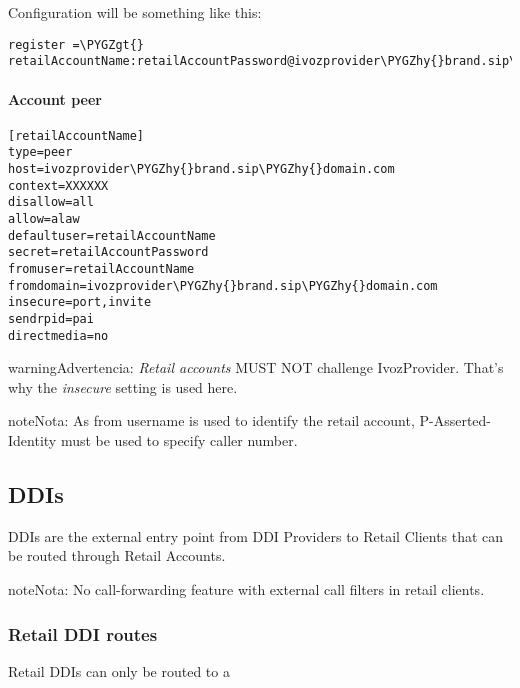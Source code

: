 \documentclass[letterpaper,10pt,spanish]{sphinxmanual}
\def\PYGZgt{\char`\>}
\def\PYGZhy{\char`\-}
\begin{document}
Configuration will be something like this:

\begin{Verbatim}[commandchars=\\\{\}]
register =\PYGZgt{} retailAccountName:retailAccountPassword@ivozprovider\PYGZhy{}brand.sip\PYGZhy{}domain.com
\end{Verbatim}


\paragraph{Account peer}
\label{administration_portal/client/retail/retail_accounts:account-peer}
\begin{Verbatim}[commandchars=\\\{\}]
[retailAccountName]
type=peer
host=ivozprovider\PYGZhy{}brand.sip\PYGZhy{}domain.com
context=XXXXXX
disallow=all
allow=alaw
defaultuser=retailAccountName
secret=retailAccountPassword
fromuser=retailAccountName
fromdomain=ivozprovider\PYGZhy{}brand.sip\PYGZhy{}domain.com
insecure=port,invite
sendrpid=pai
directmedia=no
\end{Verbatim}

\begin{notice}{warning}{Advertencia:}
\emph{Retail accounts} MUST NOT challenge IvozProvider. That's
why the \emph{insecure} setting is used here.
\end{notice}

\begin{notice}{note}{Nota:}
As from username is used to identify the retail account, P-Asserted-Identity must be used to specify caller number.
\end{notice}


\subsection{DDIs}
\label{administration_portal/client/retail/ddis:ddis}\label{administration_portal/client/retail/ddis::doc}\label{administration_portal/client/retail/ddis:retail-ddis}
DDIs are the external entry point from DDI Providers to Retail Clients that
can be routed through Retail Accounts.

\begin{notice}{note}{Nota:}
No call-forwarding feature with external call filters in retail clients.
\end{notice}


\subsubsection{Retail DDI routes}
\label{administration_portal/client/retail/ddis:retail-ddi-routes}
Retail DDIs can only be routed to a {\hyperref[administration_portal/client/retail/retail_accounts:retail\string-accounts]{}}
\end{document}
